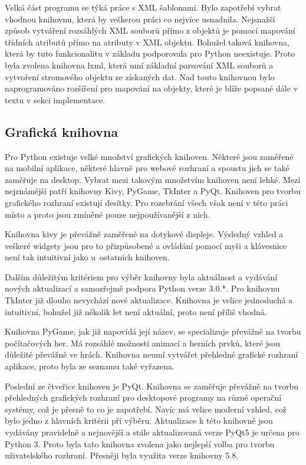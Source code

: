 \documentclass[thesis=B,czech]{resources/FITthesis}[2012/06/26]
\begin{document}
Velká část programu se týká práce s XML šablonami. Bylo zapotřebí vybrat vhodnou knihovnu, která by veškerou práci co nejvíce usnadnila. Nejsnažší způsob vytváření rozsáhlých XML souborů přímo z objektů je pomocí mapování třídních atributů přímo na atributy v XML objektu. Bohužel taková knihovna, která by tuto funkcionalitu v základu podporovala pro Python neexistuje. Proto byla zvolena knihovna lxml\cite{lxml}, která umí základní parsování XML souborů a vytvoření stromového objektu ze získaných dat. Nad touto knihovnou bylo naprogramováno rozšíření pro mapování na objekty, které je blíže popsané dále v textu v sekci implementace.



\subsection{Grafická knihovna}
Pro Python existuje velké množství grafických knihoven. Některé jsou zaměřené na mobilní aplikace, některé hlavně pro webové rozhraní a spoustu jich se také zaměřuje na desktop. Vybrat mezi takovým množstvím knihoven není lehké. Mezi nejznámější patří knihovny Kivy, PyGame, TkInter a PyQt. Knihoven pro tvorbu grafického rozhraní existují desítky. Pro rozebrání všech však není v této práci místo a proto jsou zmíněné pouze nejpoužívanější z nich.\par

Knihovna kivy je převážně zaměřené na dotykové displeje. Výsledný vzhled a veškeré widgety jsou pro to přizpůsobené a ovládání pomocí myši a klávesnice není tak intuitivní jako u~ostatních knihoven.\par

Dalším důležitým kritériem pro výběr knihovny byla aktuálnost a vydávání nových aktualizací a samozřejmě podpora Python verze 3.0.*. Pro knihovnu TkInter již dlouho nevychází nové aktualizace. Knihovna je velice jednoduchá a intuitivní, bohužel již několik let není aktuální, proto není příliš vhodná. \par

Knihovna PyGame, jak již napovídá její název, se specializuje převážně na tvorbu počítačových her. Má rozsáhlé možnosti animací a herních prvků, které jsou důležité převážně ve hrách. Knihovna neumí vytvářet přehledné grafické rozhraní aplikace, proto byla ze seznamu také vyřazena.\par

Poslední ze čtveřice knihoven je PyQt. Knihovna se zaměřuje převážně na tvorbu přehledných grafických rozhraní pro desktopové programy na různé operační systémy, což je přesně to co je zapotřebí. Navíc má velice moderní vzhled, což bylo jedno z hlavních kritérii pří výběru. Aktualizace k této knihovně jsou vydávány pravidelně a nejnovější a stále aktualizovaná verze PyQt5 je určena pro Python 3. Proto byla tato knihovna zvolena jako nejlepší volba pro tvorbu uživatelského rozhraní. Přesněji byla využita verze knihovny 5.8.
\end{document}
